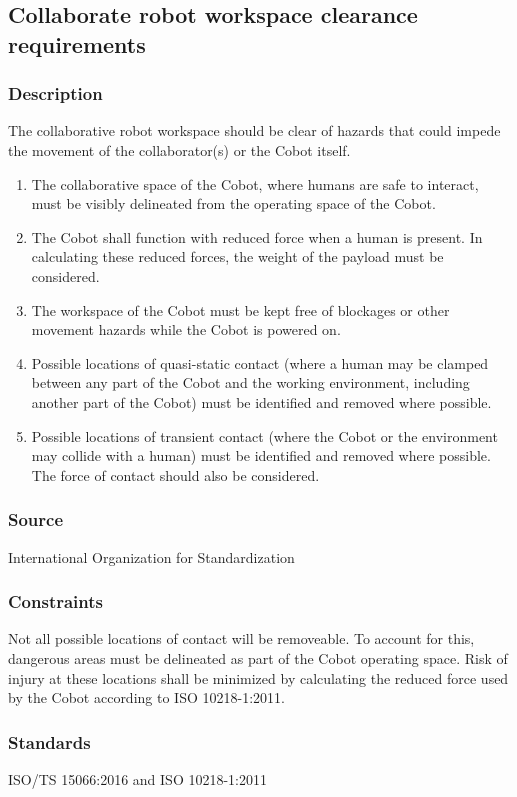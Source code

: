 \subsection{Collaborate robot workspace clearance requirements}
\subsubsection{Description}
The collaborative robot workspace should be clear of hazards that could impede the movement of the collaborator(s) or the Cobot itself.  
\begin{enumerate}
  \item The collaborative space of the Cobot, where humans are safe to interact, must be visibly delineated from the operating space of the Cobot.
  \item The Cobot shall function with reduced force when a human is present. In calculating these reduced forces, the weight of the payload must be considered.
  \item The workspace of the Cobot must be kept free of blockages or other movement hazards while the Cobot is powered on.
  \item Possible locations of quasi-static contact (where a human may be clamped between any part of the Cobot and the working environment, including another part of the Cobot) must be identified and removed where possible.
  \item Possible locations of transient contact (where the Cobot or the environment may collide with a human) must be identified and removed where possible. The force of contact should also be considered.
\end{enumerate}
\subsubsection{Source}
International Organization for Standardization
\subsubsection{Constraints}
    Not all possible locations of contact will be removeable. To account for this, dangerous areas must be delineated as part of the Cobot operating space. Risk of injury at these locations shall be minimized by calculating the reduced force used by the Cobot according to ISO 10218-1:2011.
\subsubsection{Standards}
ISO/TS 15066:2016 and ISO 10218-1:2011
